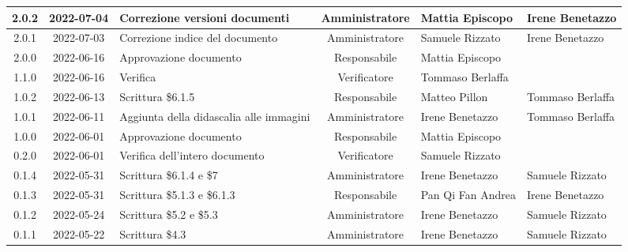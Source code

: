 \begin{center}
\begin{longtable}{ |c|c|p{8em}|c|m{5em}|m{5em}| }
	\hline
	2.0.2 & 2022-07-04 & Correzione versioni documenti & Amministratore & Mattia \newline Episcopo & Irene \newline Benetazzo\\
	\hline
	2.0.1 & 2022-07-03 & Correzione indice del documento & Amministratore & Samuele \newline Rizzato & Irene \newline Benetazzo\\
	\hline
	2.0.0 & 2022-06-16 & Approvazione documento & Responsabile & Mattia \newline Episcopo & \\
	\hline 
	1.1.0 & 2022-06-16 & Verifica & Verificatore & Tommaso \newline Berlaffa & \\
	\hline 
  1.0.2 & 2022-06-13 & Scrittura \$6.1.5 & Responsabile & Matteo \newline Pillon & Tommaso \newline Berlaffa\\
	\hline 
	1.0.1 & 2022-06-11 & Aggiunta della didascalia alle immagini & Amministratore & Irene \newline Benetazzo & Tommaso \newline Berlaffa\\
	\hline 
	1.0.0 & 2022-06-01 & Approvazione documento & Responsabile & Mattia \newline Episcopo & \\
	\hline 
	0.2.0 & 2022-06-01 & Verifica dell'intero documento & Verificatore & Samuele \newline Rizzato & \\
	\hline 
	0.1.4 & 2022-05-31 & Scrittura \$6.1.4 e \$7 & Amministratore & Irene \newline Benetazzo & Samuele \newline Rizzato\\
	\hline 
	0.1.3 & 2022-05-31 & Scrittura \$5.1.3 e \$6.1.3 & Responsabile & Pan Qi Fan \newline Andrea & Irene \newline Benetazzo \\
	\hline
	0.1.2 & 2022-05-24 & Scrittura \$5.2 e \$5.3 & Amministratore & Irene \newline Benetazzo & Samuele \newline Rizzato \\
	\hline
	0.1.1 & 2022-05-22 & Scrittura \$4.3 & Amministratore & Irene \newline Benetazzo & Samuele \newline Rizzato \\

\end{longtable}
\end{center}
